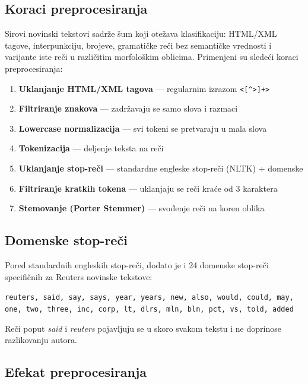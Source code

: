 \documentclass[12pt, a4paper]{article}
\begin{document}
\subsection{Koraci preprocesiranja}

Sirovi novinski tekstovi sadrže šum koji otežava klasifikaciju: HTML/XML tagove,
interpunkciju, brojeve, gramatičke reči bez semantičke vrednosti i varijante iste reči
u različitim morfološkim oblicima. Primenjeni su sledeći koraci preprocesiranja:

\begin{enumerate}
    \item \textbf{Uklanjanje HTML/XML tagova} — regularnim izrazom \texttt{<[{\textasciicircum}>]+>}
    \item \textbf{Filtriranje znakova} — zadržavaju se samo slova i razmaci
    \item \textbf{Lowercase normalizacija} — svi tokeni se pretvaraju u mala slova
    \item \textbf{Tokenizacija} — deljenje teksta na reči
    \item \textbf{Uklanjanje stop-reči} — standardne engleske stop-reči (NLTK) + domenske
    \item \textbf{Filtriranje kratkih tokena} — uklanjaju se reči kraće od 3 karaktera
    \item \textbf{Stemovanje (Porter Stemmer)} — svođenje reči na koren oblika
\end{enumerate}

\subsection{Domenske stop-reči}

Pored standardnih engleskih stop-reči, dodato je i 24 domenske stop-reči specifičnih
za Reuters novinske tekstove:

\begin{center}
\texttt{reuters, said, say, says, year, years, new, also, would, could, may, one, two, three,
inc, corp, lt, dlrs, mln, bln, pct, vs, told, added}
\end{center}

Reči poput \textit{said} i \textit{reuters} pojavljuju se u skoro svakom tekstu i ne
doprinose razlikovanju autora.

\subsection{Efekat preprocesiranja}
\end{document}
